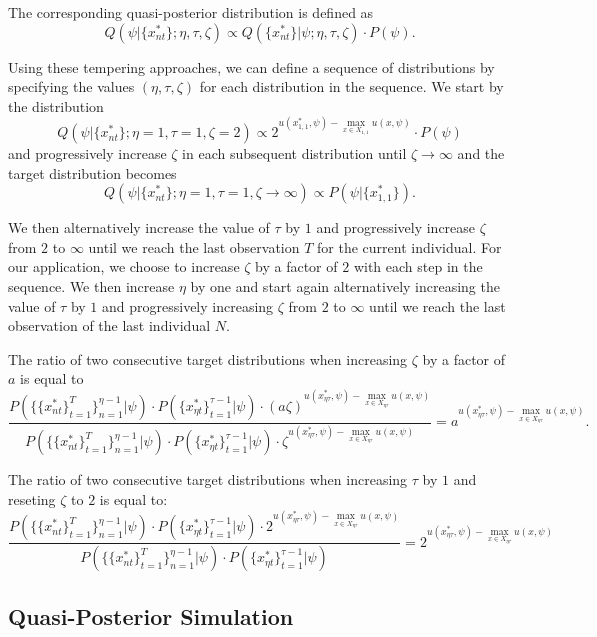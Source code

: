 \documentclass[12pt]{article}
\begin{document}
The corresponding quasi-posterior distribution is defined as
$$ Q(\psi|\{x_{nt}^*\};\eta,\tau,\zeta) \propto Q(\{x_{nt}^*\}|\psi;\eta,\tau,\zeta) \cdot P(\psi) .$$

Using these tempering approaches, we can define a sequence of distributions by specifying the values $(\eta,\tau,\zeta)$ for each distribution in the sequence. We start by the distribution 
$$Q(\psi|\{x_{nt}^*\};\eta=1,\tau=1,\zeta=2) \propto 2^{ u(x_{1,1}^*,\psi) - \max_{x \in X_{1,1}} u(x,\psi)} \cdot P(\psi)$$ 
and progressively increase $\zeta$ in each subsequent distribution until $\zeta \to \infty$ and the target distribution becomes
$$ Q(\psi|\{x_{nt}^*\};\eta=1,\tau=1,\zeta \to \infty) \propto  P(\psi|\{x_{1,1}^*\}).$$

We then alternatively increase the value of $\tau$ by $1$ and progressively increase $\zeta$ from $2$ to $\infty$ until we reach the last observation $T$ for the current individual. For our application, we choose to increase $\zeta$ by a factor of $2$ with each step in the sequence. We then increase $\eta$ by one and start again alternatively increasing the value of $\tau$ by $1$ and progressively increasing $\zeta$ from $2$ to $\infty$ until we reach the last observation of the last individual $N$.

The ratio of two consecutive target distributions when increasing $\zeta$ by a factor of $a$ is equal to
$$ \frac{P(\{\{x_{nt}^*\}_{t=1}^T\}_{n=1}^{\eta-1}|\psi) \cdot  P(\{x_{\eta t}^*\}_{t=1}^{\tau-1}|\psi) \cdot (a \zeta)^{ u(x_{\eta \tau}^*,\psi) - \max_{x \in X_{\eta \tau}} u(x,\psi)}}{P(\{\{x_{nt}^*\}_{t=1}^T\}_{n=1}^{\eta-1}|\psi) \cdot  P(\{x_{\eta t}^*\}_{t=1}^{\tau-1}|\psi) \cdot \zeta^{ u(x_{\eta \tau}^*,\psi) - \max_{x \in X_{\eta \tau}} u(x,\psi)}} = a^{ u(x_{\eta \tau}^*,\psi) - \max_{x \in X_{\eta \tau}} u(x,\psi)}.$$

The ratio of two consecutive target distributions when increasing $\tau$ by $1$ and reseting $\zeta$ to $2$ is equal to:
$$ \frac{  P(\{\{x_{nt}^*\}_{t=1}^T\}_{n=1}^{\eta-1}|\psi) \cdot  P(\{x_{\eta t}^*\}_{t=1}^{\tau-1}|\psi) \cdot 2^{ u(x_{\eta \tau}^*,\psi) - \max_{x \in X_{\eta \tau}} u(x,\psi)}}{P(\{\{x_{nt}^*\}_{t=1}^T\}_{n=1}^{\eta-1}|\psi) \cdot  P(\{x_{\eta t}^*\}_{t=1}^{\tau-1}|\psi)} = 2^{ u(x_{\eta \tau}^*,\psi) - \max_{x \in X_{\eta \tau}} u(x,\psi)} $$

\subsection{Quasi-Posterior Simulation}
\end{document}
